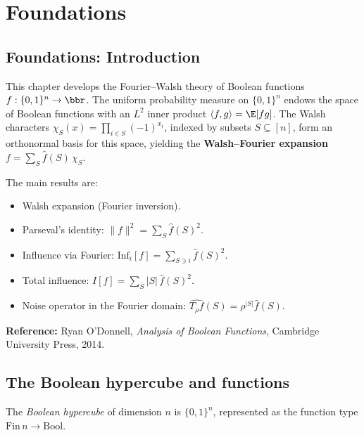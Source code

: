 \section{Foundations}
\subsection*{Foundations: Introduction}

This chapter develops the Fourier--Walsh theory of Boolean functions
$f : \{0,1\}^n \to \bbr$.  The uniform probability measure on $\{0,1\}^n$
endows the space of Boolean functions with an $L^2$ inner product
$\langle f, g\rangle = \E[fg]$.  The Walsh characters
$\chi_S(x) = \prod_{i\in S}(-1)^{x_i}$, indexed by subsets $S\subseteq[n]$,
form an orthonormal basis for this space, yielding the \textbf{Walsh--Fourier
expansion} $f = \sum_S \hat f(S)\,\chi_S$.

The main results are:
\begin{itemize}
  \item Walsh expansion (Fourier inversion).
  \item Parseval's identity: $\|f\|^2 = \sum_S \hat f(S)^2$.
  \item Influence via Fourier: $\mathrm{Inf}_i[f] = \sum_{S\ni i}\hat f(S)^2$.
  \item Total influence: $I[f] = \sum_S |S|\,\hat f(S)^2$.
  \item Noise operator in the Fourier domain: $\widehat{T_\rho f}(S) = \rho^{|S|}\hat f(S)$.
\end{itemize}

\textbf{Reference:} Ryan O'Donnell, \emph{Analysis of Boolean Functions},
Cambridge University Press, 2014.

\subsection{The Boolean hypercube and functions}

\begin{definition}
\label{BooleanAnalysis.BoolCube}
\leanok
The \emph{Boolean hypercube} of dimension $n$ is $\{0,1\}^n$,
represented as the function type $\mathrm{Fin}\,n \to \mathrm{Bool}$.
\end{definition}

